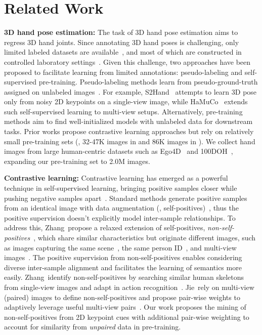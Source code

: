 \section{Related Work}

\textbf{3D hand pose estimation:}
The task of 3D hand pose estimation aims to regress 3D hand joints. Since annotating 3D hand poses is challenging, only limited labeled datasets are available~\citep{ohkawa:ijcv23}, and most of which are constructed in controlled laboratory settings~\citep{zimmermann:iccv19,chao:cvpr21,moon:eccv20,ohkawa:cvpr23}. Given this challenge, two approaches have been proposed to facilitate learning from limited annotations: pseudo-labeling and self-supervised pre-training. Pseudo-labeling methods learn from pseudo-ground-truth assigned on unlabeled images~\citep{chen:cvpr21,zheng:iccv23,liu:cvpr21,yang:iccv21,ohkawa:eccv22,liu:cvpr24}. For example, S2Hand~\citep{chen:cvpr21} attempts to learn 3D pose only from noisy 2D keypoints on a single-view image, while HaMuCo~\citep{zheng:iccv23} extends such self-supervised learning to multi-view setups. Alternatively, pre-training methods aim to find well-initialized models with unlabeled data for downstream tasks. Prior works propose contrastive learning approaches but rely on relatively small pre-training sets (\eg, 32-47K images in \citep{spurr:iccv21} and 86K images in \citep{ziani:3dv22}). We collect hand images from large human-centric datasets such as Ego4D~\citep{grauman:cvpr22} and 100DOH~\citep{shan:cvpr20}, expanding our pre-training set to 2.0M images.

\textbf{Contrastive learning:}
Contrastive learning has emerged as a powerful technique in self-supervised learning, bringing positive samples closer while pushing negative samples apart~\citep{chopra:cvpr05, schroff:cvpr15, ohsong:cvpr16, sohn:nips16, he:cvpr20, huang:cvpr23}. Standard methods generate positive samples from an identical image with data augmentation (\ie, self-positives)~\citep{grill:neurips20, caron:neurips20, chen_2:cvpr21, radford:icml21, caron:iccv21}, thus the positive supervision doesn't explicitly model inter-sample relationships. To address this, Zhang~\etal propose a relaxed extension of self-positives, \textit{non-self-positives}~\citep{zhang:eccv22}, which share similar characteristics but originate different images, such as images capturing the same scene~\citep{Arandjelovic:cvpr16, ge:eccv20, berton:cvpr22, Hausler:cvpr21}, the same person ID~\citep{chen:iccv21, chen_3:cvpr21}, and multi-view images~\citep{jie:neurips20}. The positive supervision from non-self-positives enables considering diverse inter-sample alignment and facilitates the learning of semantics more easily. Zhang~\etal identify non-self-positives by searching similar human skeletons from single-view images and adapt in action recognition~\citep{zhang:eccv22}. Jie~\etal rely on multi-view (\ie paired) images to define non-self-positives and propose pair-wise weights to adaptively leverage useful multi-view  pairs~\citep{jie:neurips20}. Our work proposes the mining of non-self-positives from 2D keypoint cues with additional pair-wise weighting to account for similarity from \textit{unpaired} data in pre-training.